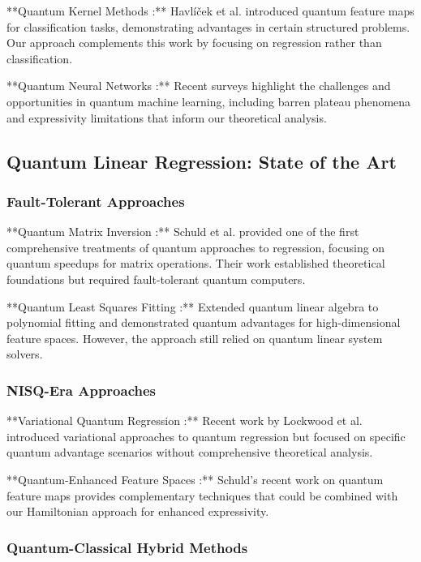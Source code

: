 \documentclass[11pt]{article}
\begin{document}
**Quantum Kernel Methods \cite{havlicek2019supervised}:** Havlíček et al. introduced quantum feature maps for classification tasks, demonstrating advantages in certain structured problems. Our approach complements this work by focusing on regression rather than classification.

**Quantum Neural Networks \cite{cerezo2021variational}:** Recent surveys highlight the challenges and opportunities in quantum machine learning, including barren plateau phenomena and expressivity limitations that inform our theoretical analysis.

\subsection{Quantum Linear Regression: State of the Art}

\subsubsection{Fault-Tolerant Approaches}

**Quantum Matrix Inversion \cite{schuld2016prediction}:** Schuld et al. provided one of the first comprehensive treatments of quantum approaches to regression, focusing on quantum speedups for matrix operations. Their work established theoretical foundations but required fault-tolerant quantum computers.

**Quantum Least Squares Fitting \cite{wang2017quantum}:** Extended quantum linear algebra to polynomial fitting and demonstrated quantum advantages for high-dimensional feature spaces. However, the approach still relied on quantum linear system solvers.

\subsubsection{NISQ-Era Approaches}

**Variational Quantum Regression \cite{lockwood2022quantum}:** Recent work by Lockwood et al. introduced variational approaches to quantum regression but focused on specific quantum advantage scenarios without comprehensive theoretical analysis.

**Quantum-Enhanced Feature Spaces \cite{schuld2021supervised}:** Schuld's recent work on quantum feature maps provides complementary techniques that could be combined with our Hamiltonian approach for enhanced expressivity.

\subsubsection{Quantum-Classical Hybrid Methods}
\end{document}
